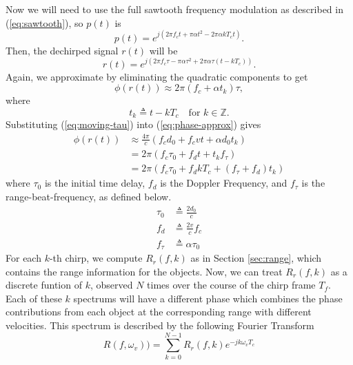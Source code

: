 Now we will need to use the full sawtooth frequency modulation as described in
(\ref{eq:sawtooth}), so $p(t)$ is
\begin{equation}
	p(t) = e^{j(2\pi f_c t+ \pi \alpha t^2 - 2\pi\alpha kT_c t)}.
\end{equation}
Then, the dechirped signal $r(t)$ will be
\begin{equation}
	r(t) = e^{j(2\pi f_c \tau - \pi \alpha \tau^2 + 2\pi\alpha\tau (t-kT_c))}.
\end{equation}
Again, we approximate by eliminating the quadratic components to get
\begin{equation}
	\phi (r(t)) \approx 2\pi (f_c + \alpha t_k)\tau,
	\label{eq:phase-approx}
\end{equation}
where 
\begin{equation}
	t_k \triangleq t - kT_c \quad \text{for }k\in\mathbb{Z}.
\end{equation}
Substituting (\ref{eq:moving-tau}) into (\ref{eq:phase-approx}) gives
\begin{align}
	\phi (r(t)) &\approx \frac{4\pi}{c}(f_c d_0 + f_c vt + \alpha d_0 t_k)\\
	&= 2\pi (f_c \tau_0 + f_d t + t_k f_{\tau})\\
	&= 2\pi (f_c \tau_0 + f_d k T_c + (f_{\tau} + f_d) t_k)
\end{align}
where $\tau_0$ is the initial time delay, $f_d$ is the Doppler Frequency, and
$f_{\tau}$ is the range-beat-frequency, as defined below.
\begin{align}
	\tau_0 &\triangleq \frac{2d_0}{c}\\
	f_d &\triangleq \frac{2v}{c} f_c\\
	f_{\tau} &\triangleq \alpha\tau_0
\end{align}
For each $k$-th chirp, we compute $R_r(f,k)$ as in Section \ref{sec:range}, which
contains the range information for the objects. Now, we can treat $R_r(f,k)$ as a
discrete funtion of $k$, observed $N$ times over the course of the chirp frame
$T_f$. Each of these $k$ spectrums will have a different phase which combines the
phase contributions from each object at the corresponding range with different
velocities. This spectrum is described by the following Fourier Transform
\begin{equation}
	R(f, \omega_v)) = \sum_{k=0}^{N-1}R_r(f, k) e^{-jk \omega_v T_c}
\end{equation}
